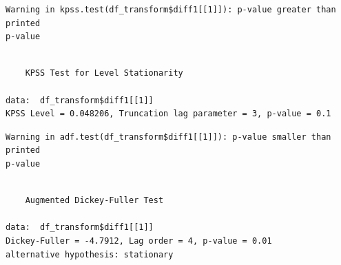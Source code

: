 \documentclass[
  number]{elsarticle}
\newenvironment{Shaded}{\begin{snugshade}}{\end{snugshade}}
\newcommand{\AttributeTok}[1]{\textcolor[rgb]{0.40,0.45,0.13}{#1}}
\newcommand{\DecValTok}[1]{\textcolor[rgb]{0.68,0.00,0.00}{#1}}
\newcommand{\FunctionTok}[1]{\textcolor[rgb]{0.28,0.35,0.67}{#1}}
\newcommand{\NormalTok}[1]{\textcolor[rgb]{0.00,0.23,0.31}{#1}}
\newcommand{\OtherTok}[1]{\textcolor[rgb]{0.00,0.23,0.31}{#1}}
\newcommand{\SpecialCharTok}[1]{\textcolor[rgb]{0.37,0.37,0.37}{#1}}
\begin{document}
\begin{Shaded}
\end{Shaded}

\begin{verbatim}
Warning in kpss.test(df_transform$diff1[[1]]): p-value greater than printed
p-value
\end{verbatim}

\begin{verbatim}

    KPSS Test for Level Stationarity

data:  df_transform$diff1[[1]]
KPSS Level = 0.048206, Truncation lag parameter = 3, p-value = 0.1
\end{verbatim}

\begin{Shaded}
\end{Shaded}

\begin{verbatim}
Warning in adf.test(df_transform$diff1[[1]]): p-value smaller than printed
p-value
\end{verbatim}

\begin{verbatim}

    Augmented Dickey-Fuller Test

data:  df_transform$diff1[[1]]
Dickey-Fuller = -4.7912, Lag order = 4, p-value = 0.01
alternative hypothesis: stationary
\end{verbatim}

\begin{Shaded}
\end{Shaded}
\end{document}
